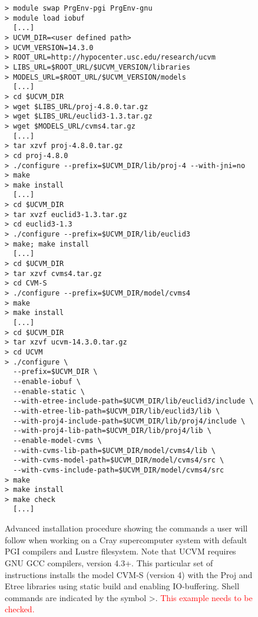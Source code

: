 

\begin{figure}[th]
\begin{lstlisting}[frame=single,basewidth={0.5em,0.4em},backgroundcolor=\color{mylistingbkgd},basicstyle=\ttfamily\footnotesize,breaklines=true]
> module swap PrgEnv-pgi PrgEnv-gnu
> module load iobuf
  [...]
> UCVM_DIR=<user defined path>
> UCVM_VERSION=14.3.0
> ROOT_URL=http://hypocenter.usc.edu/research/ucvm
> LIBS_URL=$ROOT_URL/$UCVM_VERSION/libraries
> MODELS_URL=$ROOT_URL/$UCVM_VERSION/models
  [...]
> cd $UCVM_DIR
> wget $LIBS_URL/proj-4.8.0.tar.gz
> wget $LIBS_URL/euclid3-1.3.tar.gz
> wget $MODELS_URL/cvms4.tar.gz
  [...]
> tar xzvf proj-4.8.0.tar.gz
> cd proj-4.8.0
> ./configure --prefix=$UCVM_DIR/lib/proj-4 --with-jni=no
> make
> make install
  [...]
> cd $UCVM_DIR
> tar xvzf euclid3-1.3.tar.gz
> cd euclid3-1.3
> ./configure --prefix=$UCVM_DIR/lib/euclid3
> make; make install
  [...]
> cd $UCVM_DIR
> tar xzvf cvms4.tar.gz
> cd CVM-S
> ./configure --prefix=$UCVM_DIR/model/cvms4
> make
> make install
  [...]
> cd $UCVM_DIR
> tar xzvf ucvm-14.3.0.tar.gz
> cd UCVM
> ./configure \
  --prefix=$UCVM_DIR \
  --enable-iobuf \
  --enable-static \
  --with-etree-include-path=$UCVM_DIR/lib/euclid3/include \
  --with-etree-lib-path=$UCVM_DIR/lib/euclid3/lib \
  --with-proj4-include-path=$UCVM_DIR/lib/proj4/include \
  --with-proj4-lib-path=$UCVM_DIR/lib/proj4/lib \
  --enable-model-cvms \
  --with-cvms-lib-path=$UCVM_DIR/model/cvms4/lib \
  --with-cvms-model-path=$UCVM_DIR/model/cvms4/src \
  --with-cvms-include-path=$UCVM_DIR/model/cvms4/src
> make
> make install
> make check
  [...]
\end{lstlisting}
\caption{Advanced installation procedure showing the commands a user will follow when working on a Cray supercomputer system with default PGI compilers and Lustre filesystem. Note that UCVM requires GNU GCC compilers, version 4.3+. This particular set of instructions installs the model CVM-S (version 4) with the Proj and Etree libraries using static build and enabling IO-buffering. Shell commands are indicated by the symbol \textgreater. \textcolor{red}{This example needs to be checked.}}
\label{fig:instadvanced}
\end{figure}


